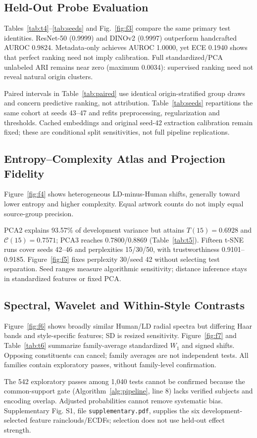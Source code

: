 \documentclass[journal,twoside,web]{IEEEtran}
\begin{document}
\subsection{Held-Out Probe Evaluation}
Tables~\ref{tab:t4}--\ref{tab:seeds} and Fig.~\ref{fig:f3} compare the same primary test identities. ResNet-50 (0.9999) and DINOv2 (0.9997) outperform handcrafted AUROC 0.9824. Metadata-only achieves AUROC 1.0000, yet ECE 0.1940 shows that perfect ranking need not imply calibration. Full standardized/PCA unlabeled ARI remains near zero (maximum 0.0034): supervised ranking need not reveal natural origin clusters.

Paired intervals in Table~\ref{tab:paired} use identical origin-stratified group draws and concern predictive ranking, not attribution. Table~\ref{tab:seeds} repartitions the same cohort at seeds 43--47 and refits preprocessing, regularization and thresholds. Cached embeddings and original seed-42 extraction calibration remain fixed; these are conditional split sensitivities, not full pipeline replications.




\subsection{Entropy--Complexity Atlas and Projection Fidelity}
Figure~\ref{fig:f4} shows heterogeneous LD-minus-Human shifts, generally toward lower entropy and higher complexity. Equal artwork counts do not imply equal source-group precision.

PCA2 explains 93.57\% of development variance but attains $T(15)=0.6928$ and $\mathcal{C}(15)=0.7571$; PCA3 reaches 0.7800/0.8869 (Table~\ref{tab:t5}). Fifteen t-SNE \cite{tsne} runs cover seeds 42--46 and perplexities 15/30/50, with trustworthiness 0.9101--0.9185. Figure~\ref{fig:f5} fixes perplexity 30/seed 42 without selecting test separation. Seed ranges measure algorithmic sensitivity; distance inference stays in standardized features or fixed PCA.



\subsection{Spectral, Wavelet and Within-Style Contrasts}
Figure~\ref{fig:f6} shows broadly similar Human/LD radial spectra but differing Haar bands and style-specific features; SD is resized sensitivity. Figure~\ref{fig:f7} and Table~\ref{tab:t6} summarize family-average standardized $W_1$ and signed shifts. Opposing constituents can cancel; family averages are not independent tests. All families contain exploratory passes, without family-level confirmation.



The 542 exploratory passes among 1,040 tests cannot be confirmed because the common-support gate (Algorithm~\ref{alg:pipeline}, line 8) lacks verified subjects and encoding overlap. Adjusted probabilities cannot remove systematic bias. Supplementary Fig. S1, file \texttt{supplementary.pdf}, supplies the six development-selected feature rainclouds/ECDFs; selection does not use held-out effect strength.
\end{document}
